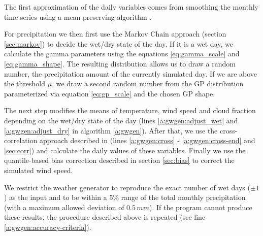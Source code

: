 \begin{refsection}
The first approximation of the daily variables comes from smoothing the monthly time series using a mean-preserving algorithm \citep{RymesMyers2001}.

For precipitation we then first use the Markov Chain approach (section \ref{sec:markov}) to decide the wet/dry state of the day. If it is a wet day, we calculate the gamma parameters using the equations \eqref{eq:gamma_scale} and \eqref{eq:gamma_shape}. The resulting distribution allows us to draw a random number, the precipitation amount of the currently simulated day. If we are above the threshold $\mu$, we draw a second random number from the GP distribution parameterized via equation \eqref{eq:gp_scale} and the chosen GP shape.

The next step modifies the means of temperature, wind speed and cloud fraction depending on the wet/dry state of the day (lines \ref{a:gwgen:adjust_wet} and \ref{a:gwgen:adjust_dry} in algorithm \ref{a:gwgen}). After that, we use the cross-correlation approach described in \cite{Richardson1981} (lines \ref{a:gwgen:cross} - \ref{a:gwgen:cross-end} and \autoref{sec:corr}) and calculate the daily values of these variables. Finally we use the quantile-based bias correction described in section \ref{sec:bias} to correct the simulated wind speed.

We restrict the weather generator to reproduce the exact number of wet days ($\pm1$) as the input and to be within a $5\%$ range of the total monthly precipitation (with a maximum allowed deviation of $0.5\,\unit{mm}$). If the program cannot produce these results, the procedure described above is repeated (see line \ref{a:gwgen:accuracy-criteria}).


\end{refsection}
